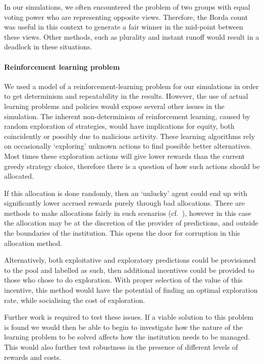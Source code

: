 In our simulations, we often encountered the problem of two groups with equal
voting power who are representing opposite views. Therefore, the Borda count was
useful in this context to generate a fair winner in the mid-point between
these views. Other methods, such as plurality and instant runoff would result
in a deadlock in these situations.

\paragraph{Reinforcement learning problem} We used a model of a 
reinforcement-learning problem for our simulations in order to get determinism and
repeatability in the results. However, the use of actual learning problems and
policies would expose several other issues in the simulation. The inherent
non-determinism of reinforcement learning, caused by random exploration of strategies,
would have implications for equity,
both coincidently or possibly due to malicious activity. These learning
algorithms rely on occasionally `exploring' unknown actions to find possible
better alternatives. Most times these exploration actions will give lower
rewards than the current greedy strategy choice, therefore there is a question
of how such actions should be allocated.

If this allocation is done randomly, then an `unlucky' agent could end up with
significantly lower accrued rewards purely through bad allocations. There are methods
to make allocations fairly in such scenarios (cf.~\citet{Pitt2014}), however
in this case the allocation may be at the discretion of the provider of predictions,
and outside the boundaries of the institution. This opens the door for
corruption in this allocation method.

Alternatively, both exploitative and exploratory predictions could be
provisioned to the pool and labelled as such, then additional incentives could
be provided to those who chose to do exploration. With proper selection of the
value of this incentive, this method would have the potential of finding an
optimal exploration rate, while socialising the cost of exploration.

Further work is required to test these issues.
If a viable solution to this problem is found we would then be able
to begin to investigate how the nature of the learning problem to be solved
affects how the institution needs to be managed. This would also further test
robustness in the presence of different levels of rewards and costs.

